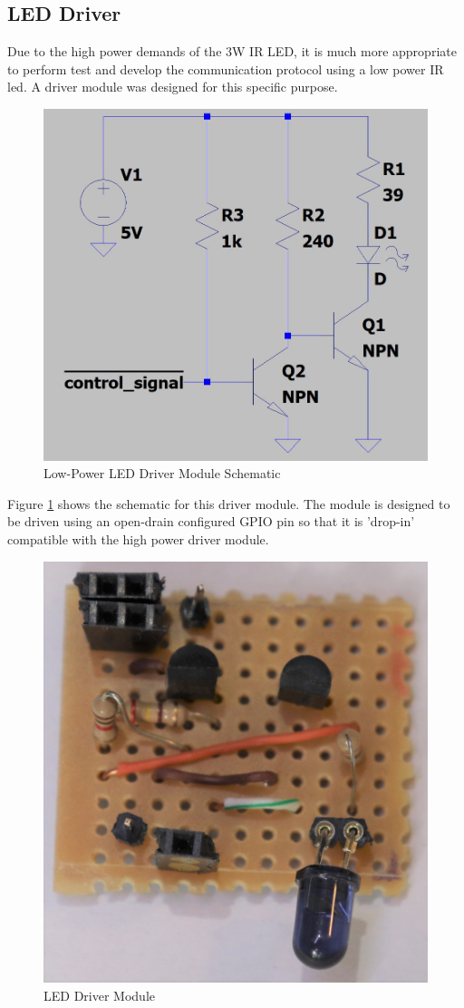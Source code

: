 \subsection{LED Driver}

Due to the high power demands of the 3W IR LED, it is much more appropriate to perform test and develop the communication protocol using a low power IR led. A driver module was designed for this specific purpose.

\begin{figure}[H]
	\centering
	\includegraphics[width=.6\textwidth]{figures/design/low_power_led_driver.JPG}
	\caption{Low-Power LED Driver Module Schematic}
	\label{fig:schematic_low_power_led_driver}
\end{figure}

Figure \ref{fig:schematic_low_power_led_driver} shows the schematic for this driver module. The module is designed to be driven using an open-drain configured GPIO pin so that it is 'drop-in' compatible with the high power driver module.


\begin{figure}[H]
	\centering
	\includegraphics[width=.6\textwidth]{figures/modules/led_driver.jpg}
	\caption{LED Driver Module}
	\label{fig:module_led_driver}
\end{figure}


